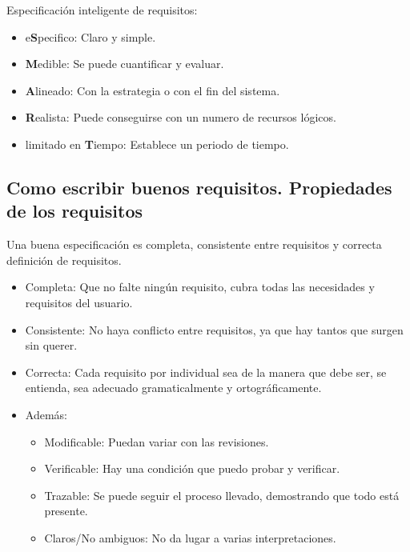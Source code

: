 \documentclass[12pt, twoside, openright]{report} %
\begin{document}
	Especificación inteligente de requisitos:
	\begin{itemize}
		\item e\textbf{S}pecifico: Claro y simple.
		\item \textbf{M}edible: Se puede cuantificar y evaluar.
		\item \textbf{A}lineado: Con la estrategia o con el fin del sistema.
		\item \textbf{R}ealista: Puede conseguirse con un numero de recursos lógicos.
		\item limitado en \textbf{T}iempo: Establece un periodo de tiempo.
	\end{itemize}
\pagebreak
\subsection{Como escribir buenos requisitos. Propiedades de los requisitos}



    Una buena especificación es completa, consistente entre requisitos y
    correcta definición de requisitos.

    \begin{itemize}
    
    \item
      Completa: Que no falte ningún requisito, cubra todas las
      necesidades y requisitos del usuario.
    \item
      Consistente: No haya conflicto entre requisitos, ya que hay tantos
      que surgen sin querer.
    \item
      Correcta: Cada requisito por individual sea de la manera que debe
      ser, se entienda, sea adecuado gramaticalmente y ortográficamente.
    \item
      Además:

      \begin{itemize}
      
      \item
        Modificable: Puedan variar con las revisiones.
      \item
        Verificable: Hay una condición que puedo probar y verificar.
      \item
        Trazable: Se puede seguir el proceso llevado, demostrando que
        todo está presente.
      \item
        Claros/No ambiguos: No da lugar a varias interpretaciones.
      \end{itemize}
    \end{itemize}
\end{document}
